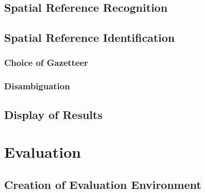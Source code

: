 \documentclass[12pt, a4paper]{report}
\begin{document}
\section{Spatial Reference Recognition}




\section{Spatial Reference Identification}

\subsection{Choice of Gazetteer}



\subsection{Disambiguation}


\section{Display of Results}



\chapter{Evaluation}

\section{Creation of Evaluation Environment}
\end{document}
